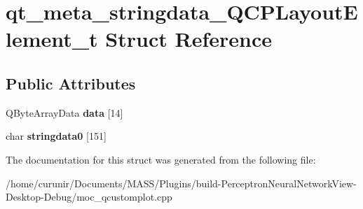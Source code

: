 \hypertarget{structqt__meta__stringdata___q_c_p_layout_element__t}{}\section{qt\+\_\+meta\+\_\+stringdata\+\_\+\+Q\+C\+P\+Layout\+Element\+\_\+t Struct Reference}
\label{structqt__meta__stringdata___q_c_p_layout_element__t}
\subsection*{Public Attributes}
\begin{DoxyCompactItemize}
\item 
Q\+Byte\+Array\+Data {\bfseries data} \mbox{[}14\mbox{]}\hypertarget{structqt__meta__stringdata___q_c_p_layout_element__t_af0ea5ebb7857a9736eb348abd41c58dc}{}\label{structqt__meta__stringdata___q_c_p_layout_element__t_af0ea5ebb7857a9736eb348abd41c58dc}

\item 
char {\bfseries stringdata0} \mbox{[}151\mbox{]}\hypertarget{structqt__meta__stringdata___q_c_p_layout_element__t_a9f6b0973752e4c3c20011438c7a6351c}{}\label{structqt__meta__stringdata___q_c_p_layout_element__t_a9f6b0973752e4c3c20011438c7a6351c}

\end{DoxyCompactItemize}


The documentation for this struct was generated from the following file\+:\begin{DoxyCompactItemize}
\item 
/home/curunir/\+Documents/\+M\+A\+S\+S/\+Plugins/build-\/\+Perceptron\+Neural\+Network\+View-\/\+Desktop-\/\+Debug/moc\+\_\+qcustomplot.\+cpp\end{DoxyCompactItemize}
